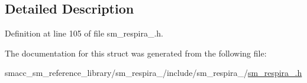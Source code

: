 \subsection{Detailed Description}


Definition at line 105 of file sm\+\_\+respira\+\_.\+h.



The documentation for this struct was generated from the following file\+:\begin{DoxyCompactItemize}
\item 
smacc\+\_\+sm\+\_\+reference\+\_\+library/sm\+\_\+respira\+\_/include/sm\+\_\+respira\+\_/\hyperlink{sm__respira__1_8h}{sm\+\_\+respira\+\_.\+h}\end{DoxyCompactItemize}
